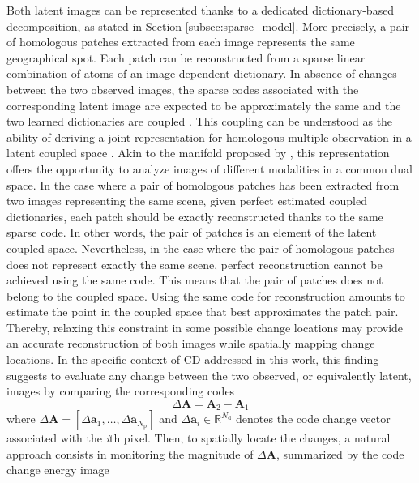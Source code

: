 \documentclass[review]{elsarticle}
\newcommand{\Natom}{N_{\mathrm{d}}}
\newcommand{\Npatch}{N_{\mathrm{p}}}
\begin{document}
Both latent images can be represented thanks to a dedicated dictionary-based decomposition, as stated in Section \ref{subsec:sparse_model}. More precisely, a pair of homologous
patches extracted from each image represents the same geographical spot. Each patch can be reconstructed from a sparse linear combination of atoms of an image-dependent dictionary. In absence of changes between the two observed images, the sparse codes associated with the corresponding latent image are expected to be approximately the same and the two learned dictionaries are coupled \citep{yang_image_2010,yang_coupled_2012,zeyde_single_2010}. This coupling can be understood as the ability of deriving a joint representation for homologous multiple observation in a latent coupled space \citep{gong_coupled_2016}. Akin to the manifold proposed by \citet{prendes_new_2015}, this representation offers the opportunity to analyze images of different modalities in a common dual space. In the case where a pair of homologous patches has been extracted from two images representing the same scene, given perfect estimated coupled dictionaries, each patch should be exactly reconstructed thanks to the same sparse code. In other words, the pair of patches is an element of the latent coupled space.  Nevertheless, in the case where the pair of homologous patches does not represent exactly the same scene, perfect reconstruction cannot be achieved using the same code. This means that the pair of patches does not belong to the coupled space. Using the same code for reconstruction amounts to estimate the point in the coupled space that best approximates the patch pair. Thereby, relaxing this constraint in some possible change locations may provide an accurate reconstruction of both images while
spatially mapping change locations. In the specific context of CD addressed in this work, this finding suggests to evaluate any change between the two observed, or equivalently latent, images by comparing the corresponding codes
%
\begin{equation}
\label{eq:code_relaxation}
	\Delta\mathbf{A} = \mathbf{A}_{2} - \mathbf{A}_{1}
\end{equation}
%
where $\Delta\mathbf{A}=\left[\Delta\mathbf{a}_1,\ldots,\Delta\mathbf{a}_{\Npatch} \right] $ and $\Delta\mathbf{a}_{i} \in \mathbb{R}^{\Natom}$ denotes the code change vector associated with the \textit{i}th pixel. Then, to spatially locate the changes, a natural approach consists in monitoring the magnitude of $\Delta\mathbf{A}$, summarized by the code change energy image \citep{bovolo_theoretical_2007,ferraris_robust_2017}
\end{document}
